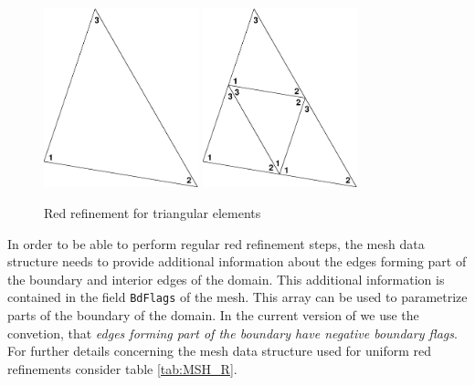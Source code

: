 \begin{figure}[htb]
  \centering
  \begin{minipage}[c]{0.8\textwidth}
    \includegraphics[width=0.4\textwidth]{REG_org.eps} \hfill
    \includegraphics[width=0.4\textwidth]{REG_ref.eps}
  \end{minipage}
  \caption{Red refinement for triangular elements}
  \label{fig:REG}
\end{figure}

In order to be able to perform regular red refinement steps, the mesh data structure needs to provide additional information
about the edges forming part of the boundary and interior edges of the domain. This additional information is contained in
the field {\tt BdFlags} of the mesh. This array can be used to parametrize parts of the boundary of the domain. In the current
version of \LIBNAME we use the convetion, that {\em edges forming part of the boundary have negative boundary flags}. For further
details concerning the mesh data structure used for uniform red refinements consider table \ref{tab:MSH_R}.

